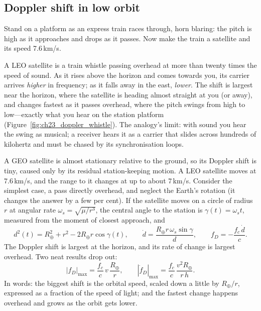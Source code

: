 \subsection{Doppler shift in low orbit}
\label{sec:ch23:doppler}

Stand on a platform as an express train races through, horn blaring: the pitch is high as it
approaches and drops as it passes. Now make the train a satellite and its speed 7.6\,km/s.

\begin{analogy}
A LEO satellite is a train whistle passing overhead at more than twenty times the speed of sound.
As it rises above the horizon and comes towards you, its carrier arrives \emph{higher} in frequency;
as it falls away in the east, \emph{lower}. The shift is largest near the horizon, where the
satellite is heading almost straight at you (or away), and changes fastest as it passes overhead,
where the pitch swings from high to low---exactly what you hear on the station platform
(Figure~\ref{fig:ch23_doppler_whistle}). The analogy's limit: with sound you hear the swing as
musical; a receiver hears it as a carrier that slides across hundreds of kilohertz and must be
chased by its synchronisation loops.
\end{analogy}


A GEO satellite is almost stationary relative to the ground, so its Doppler shift is tiny,
caused only by its residual station-keeping motion. A LEO satellite moves at 7.6\,km/s, and the
range to it changes at up to about 7\,km/s. Consider the simplest case, a pass directly
overhead, and neglect the Earth's rotation (it changes the answer by a few per cent). If the
satellite moves on a circle of radius $r$ at angular rate $\omega_s=\sqrt{\mu/r^3}$, the central
angle to the station is $\gamma(t)=\omega_st$, measured from the moment of closest approach, and
\begin{equation}
d^2(t)=R_\oplus^2+r^2-2R_\oplus r\cos\gamma(t),\qquad
\dot d=\frac{R_\oplus r\,\omega_s\sin\gamma}{d},\qquad
f_D=-\frac{f_c\,\dot d}{c}.
\label{eq:ch23:doppler}
\end{equation}
The Doppler shift is largest at the horizon, and its rate of change is largest overhead. Two neat
results drop out:
\begin{equation}
|f_D|_{\max}=\frac{f_c}{c}\,v\,\frac{R_\oplus}{r},\qquad
|\dot f_D|_{\max}=\frac{f_c}{c}\,\frac{v^2R_\oplus}{r\,h}.
\label{eq:ch23:dopplermax}
\end{equation}
In words: the biggest shift is the orbital speed, scaled down a little by $R_\oplus/r$, expressed as
a fraction of the speed of light; and the fastest change happens overhead and grows as the orbit
gets lower.

